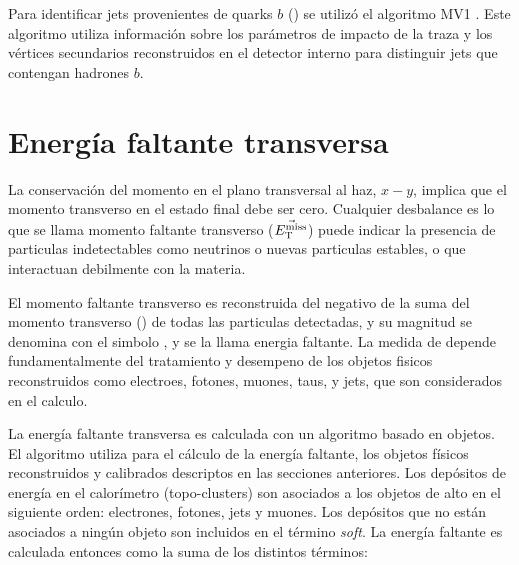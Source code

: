 
Para identificar jets provenientes de quarks $b$ (\bjets) se utilizó el
algoritmo MV1 \cite{ATLAS-CONF-2014-046,btagging}.
Este algoritmo utiliza
información sobre los parámetros de impacto de la traza y los vértices
secundarios reconstruidos en el detector interno para distinguir jets que
contengan hadrones $b$.



\section{Energía faltante transversa}
\label{sec:met_obj}

La conservación del momento en el plano transversal al haz, $x-y$, implica que
el momento transverso en el estado final debe ser cero. Cualquier desbalance es
lo que se llama momento faltante transverso ($\vec{E_{\mathrm{T}}^{\mathrm{miss}}}$) puede indicar la
presencia de particulas indetectables como neutrinos o nuevas particulas
estables, o que interactuan debilmente con la materia.

El momento faltante transverso es reconstruida del negativo de la suma del
momento transverso (\pt) de todas las particulas detectadas, y su magnitud se
denomina con el simbolo {\met}, y se la llama energia faltante. La medida de
{\met} depende fundamentalmente del tratamiento y desempeno de los objetos
fisicos reconstruidos como electroes, fotones, muones, taus, y jets, que son
considerados en el calculo.

La energía faltante transversa es calculada con un algoritmo basado en objetos\cite{Khoo:2012749}.
El algoritmo utiliza para el cálculo de la energía faltante, los objetos físicos
reconstruidos y calibrados descriptos en las secciones anteriores. Los depósitos
de energía en el calorímetro (topo-clusters) son asociados a los objetos de alto
{\pt} en el siguiente orden: electrones, fotones, jets y muones. Los depósitos
que no están asociados a ningún objeto son incluidos en el término \emph{soft}.
La energía faltante es calculada entonces como la suma de los distintos
términos:

